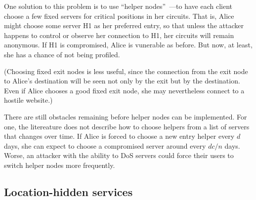 \documentclass{llncs}
\begin{document}
One solution to this problem is to use ``helper nodes''~\cite{wright02,wright03}---to
have each client choose a few fixed servers for critical positions in her
circuits.  That is, Alice might choose some server H1 as her preferred
entry, so that unless the attacker happens to control or observe her
connection to H1, her circuits will remain anonymous.  If H1 is compromised,
Alice is vunerable as before.  But now, at least, she has a chance of
not being profiled.

(Choosing fixed exit nodes is less useful, since the connection from the exit
node to Alice's destination will be seen not only by the exit but by the
destination.  Even if Alice chooses a good fixed exit node, she may
nevertheless connect to a hostile website.)

There are still obstacles remaining before helper nodes can be implemented.
For one, the litereature does not describe how to choose helpers from a list
of servers that changes over time.  If Alice is forced to choose a new entry
helper every $d$ days, she can expect to choose a compromised server around
every $dc/n$ days.  Worse, an attacker with the ability to DoS servers could
force their users to switch helper nodes more frequently.


%


\subsection{Location-hidden services}
\label{subsec:hidden-services}
\end{document}

